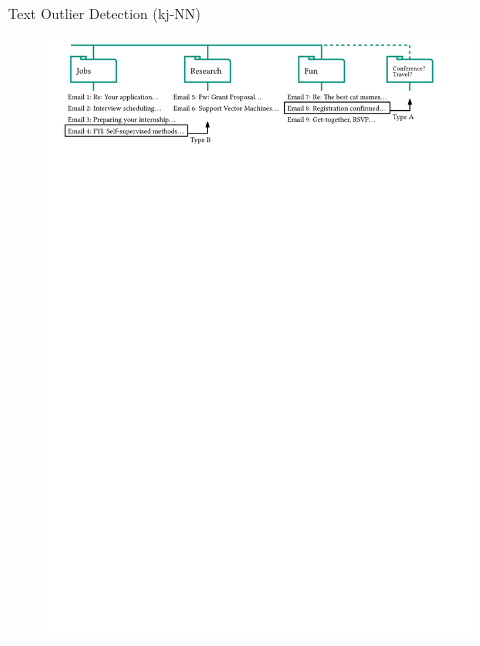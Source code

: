 \documentclass[16pt,usenames,dvipsnames, notheorems]{beamer}
\theoremstyle{definition}
\theoremstyle{example}
\theoremstyle{plain}
\begin{document}
\begin{frame}{Text Outlier Detection (kj-NN)}

\begin{figure}
	 \includegraphics[width=\linewidth]{figures/illustrative_example_2-compressed.pdf}
\end{figure}


\end{frame}
\end{document}
